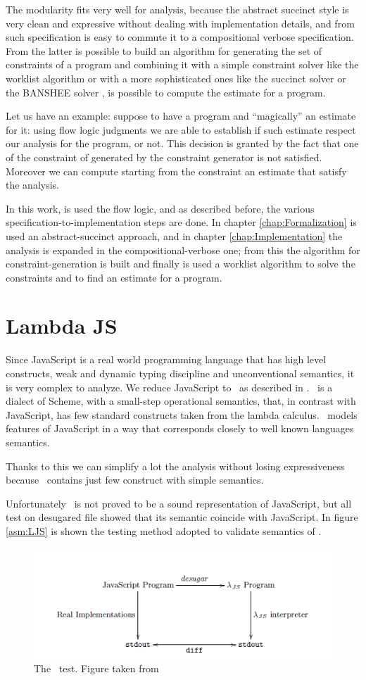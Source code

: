 The modularity fits very well for analysis, because the abstract succinct style is very clean and expressive without dealing with implementation details, and from such specification is easy to commute it to a compositional verbose specification. From the latter is possible to build an algorithm for generating the set of constraints of a program and combining it with a simple constraint solver like the worklist algorithm \cite{PrincipleProgramAnalysis} or with a more sophisticated ones like the succinct solver \cite{SuccinctSolver} or the BANSHEE solver \cite{BansheeSolver}, is possible to compute the estimate for a program.

Let us have an example: suppose to have a program and ``magically'' an estimate for it: using flow logic judgments we are able to establish if such estimate respect our analysis for the program, or not. This decision is granted by the fact that one of the constraint of generated by the constraint generator is not satisfied. Moreover we can compute starting from the constraint an estimate that satisfy the analysis.

In this work, is used the flow logic, and as described before, the various specification-to-implementation steps are done. In chapter \ref{chap:Formalization} is used an abstract-succinct approach, and in chapter \ref{chap:Implementation} the analysis is expanded in the compositional-verbose one; from this the algorithm for constraint-generation is built and finally is used a worklist algorithm to solve the constraints and to find an estimate for a program.

\section{Lambda JS}
Since JavaScript is a real world programming language that has high level constructs, weak and dynamic typing discipline and unconventional semantics, it is very complex to analyze. We reduce JavaScript to \ljs\ as described in \cite{LambdaJS}. \ljs\ is a dialect of Scheme, with a small-step operational semantics, that, in contrast with JavaScript, has few standard constructs taken from the lambda calculus. \ljs\ models features of JavaScript in a way that corresponds closely to well known languages semantics.

Thanks to this we can simplify a lot the analysis without losing expressiveness because \ljs\ contains just few construct with simple semantics.

Unfortunately \ljs\ is not proved to be a sound representation of JavaScript, but all test on desugared file showed that its semantic coincide with JavaScript. In figure \ref{asm:LJS} is shown the testing method adopted to validate semantics of \ljs.

\begin{figure}[htb]
    \centering
    \includegraphics[scale=1]{LambdaJS}
    \caption{The \ljs\ test. Figure taken from \cite{LambdaJS}}
    \label{fig:LJS}
\end{figure}